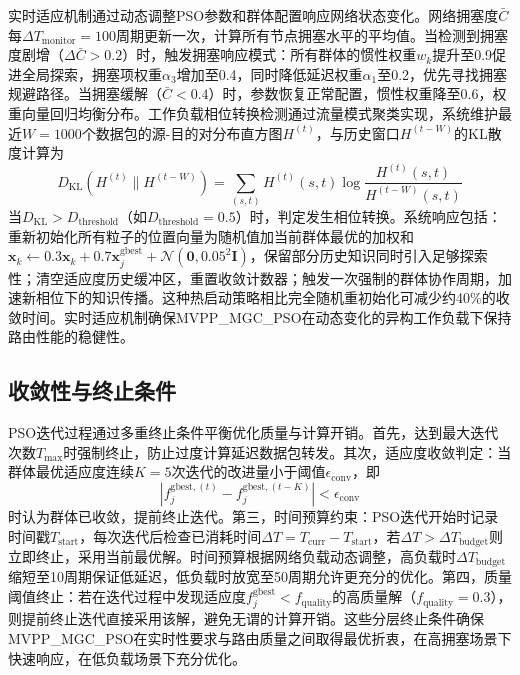 实时适应机制通过动态调整PSO参数和群体配置响应网络状态变化。网络拥塞度$\bar{C}$每$\Delta T_{\text{monitor}} = 100$周期更新一次，计算所有节点拥塞水平的平均值。当检测到拥塞度剧增（$\Delta \bar{C} > 0.2$）时，触发拥塞响应模式：所有群体的惯性权重$w_k$提升至0.9促进全局探索，拥塞项权重$\alpha_3$增加至0.4，同时降低延迟权重$\alpha_1$至0.2，优先寻找拥塞规避路径。当拥塞缓解（$\bar{C} < 0.4$）时，参数恢复正常配置，惯性权重降至0.6，权重向量回归均衡分布。工作负载相位转换检测通过流量模式聚类实现，系统维护最近$W = 1000$个数据包的源-目的对分布直方图$H^{(t)}$，与历史窗口$H^{(t-W)}$的KL散度计算为
\begin{equation}
D_{\text{KL}}(H^{(t)} \| H^{(t-W)}) = \sum_{(s,t)} H^{(t)}(s,t) \log \frac{H^{(t)}(s,t)}{H^{(t-W)}(s,t)}
\end{equation}
当$D_{\text{KL}} > D_{\text{threshold}}$（如$D_{\text{threshold}} = 0.5$）时，判定发生相位转换。系统响应包括：重新初始化所有粒子的位置向量为随机值加当前群体最优的加权和$\mathbf{x}_k \leftarrow 0.3 \mathbf{x}_k + 0.7 \mathbf{x}_j^{\text{gbest}} + \mathcal{N}(\mathbf{0}, 0.05^2 \mathbf{I})$，保留部分历史知识同时引入足够探索性；清空适应度历史缓冲区，重置收敛计数器；触发一次强制的群体协作周期，加速新相位下的知识传播。这种热启动策略相比完全随机重初始化可减少约40\%的收敛时间。实时适应机制确保MVPP\_MGC\_PSO在动态变化的异构工作负载下保持路由性能的稳健性。

\subsection{收敛性与终止条件}

PSO迭代过程通过多重终止条件平衡优化质量与计算开销。首先，达到最大迭代次数$T_{\max}$时强制终止，防止过度计算延迟数据包转发。其次，适应度收敛判定：当群体最优适应度连续$K = 5$次迭代的改进量小于阈值$\epsilon_{\text{conv}}$，即
\begin{equation}
|f_j^{\text{gbest},(t)} - f_j^{\text{gbest},(t-K)}| < \epsilon_{\text{conv}}
\end{equation}
时认为群体已收敛，提前终止迭代。第三，时间预算约束：PSO迭代开始时记录时间戳$T_{\text{start}}$，每次迭代后检查已消耗时间$\Delta T = T_{\text{curr}} - T_{\text{start}}$，若$\Delta T > \Delta T_{\text{budget}}$则立即终止，采用当前最优解。时间预算根据网络负载动态调整，高负载时$\Delta T_{\text{budget}}$缩短至10周期保证低延迟，低负载时放宽至50周期允许更充分的优化。第四，质量阈值终止：若在迭代过程中发现适应度$f_j^{\text{gbest}} < f_{\text{quality}}$的高质量解（$f_{\text{quality}} = 0.3$），则提前终止迭代直接采用该解，避免无谓的计算开销。这些分层终止条件确保MVPP\_MGC\_PSO在实时性要求与路由质量之间取得最优折衷，在高拥塞场景下快速响应，在低负载场景下充分优化。
